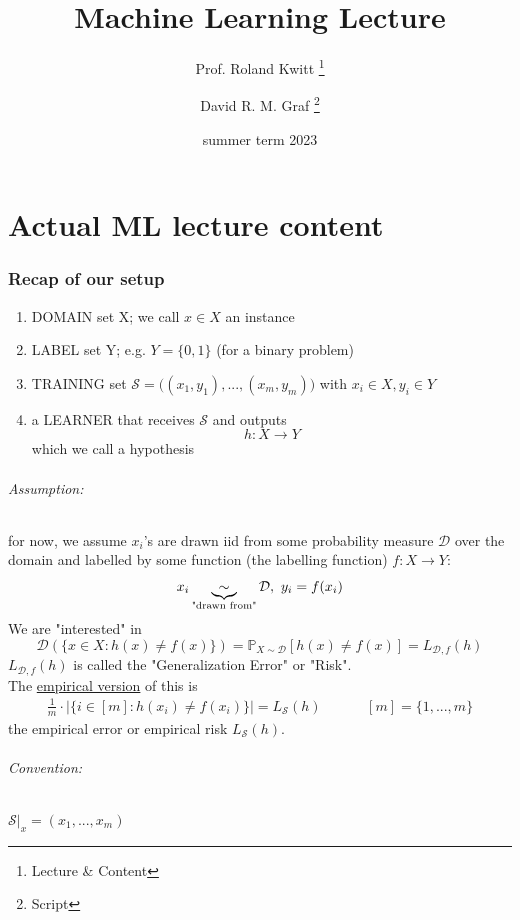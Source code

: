 \documentclass[10pt,a4paper]{article}
\title{Machine Learning Lecture}
\author{Prof. Roland Kwitt \thanks{Lecture \& Content} \and David R. M. Graf \thanks{Script}}
\date{summer term 2023}
\theoremstyle{remark}
\theoremstyle{definition}
\theoremstyle{plain}
\begin{document}
	\maketitle
\part{Actual ML lecture content}
\section*{Recap of our setup}
\begin{enumerate}
	\item DOMAIN set X; we call $x\in X$ an instance
	\item LABEL set Y; e.g. $Y = \{0, 1\}$ (for a binary problem)
	\item TRAINING set $\mathcal{S} = \big((x_1, y_1), ..., (x_m, y_m)\big)$  with $x_i \in X, y_i \in Y$
	\item a LEARNER that receives $\mathcal{S}$ and outputs 
	$$ h: X \to Y$$
	which we call a hypothesis
\end{enumerate}
\paragraph{Assumption:} for now, we assume $x_i$'s are drawn iid from some probability measure $\mathcal{D}$ over the domain and labelled by some function (the labelling function) $f: X \to Y$:
	$$ x_i \underbrace{ \sim }_{\text{\scriptsize"drawn from"}} \mathcal{D},\ y_i = f(x_i)$$
We are "interested" in 
	$$\mathcal{D}(\{x \in X: h(x) \neq f(x) \}) = \mathbb{P}_{X \sim \mathcal{D}}[h(x) \neq f(x)] = L_{\mathcal{D}, f}(h)$$
$L_{\mathcal{D}, f}(h)$ is called the "Generalization Error" or "Risk".\\
\newline
The \underline{empirical version} of this is 
\begin{align*}
	 \frac{1}{m}\cdot\bigg|\big\{ i \in [m]: h(x_i) \neq f(x_i) \big\}\bigg| = L_\mathcal{S}(h) & \hspace{1cm} [m] = \{1, ..., m\}
\end{align*}
the empirical error or empirical risk $L_\mathcal{S}(h)$.

\paragraph{Convention:} $\mathcal{S}|_x = (x_1,..., x_m)$
\end{document}
